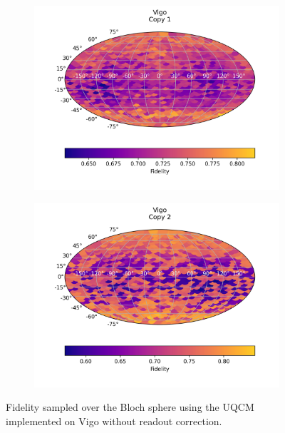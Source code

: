 \begin{figure}[H]
    \centering
    \begin{subfigure}{.5\textwidth}
      \centering
      \includegraphics[width=\textwidth]{Figures/UQCM/IBM/FullSphere/results_vigo_copy1.png}
    \end{subfigure}%
    \begin{subfigure}{.5\textwidth}
      \centering
      \includegraphics[width=\textwidth]{Figures/UQCM/IBM/FullSphere/results_vigo_copy2.png}
    \end{subfigure}
    \caption{Fidelity sampled over the Bloch sphere using the UQCM implemented on Vigo without readout correction.}
\end{figure}

